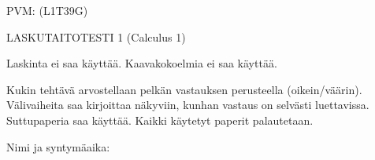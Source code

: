 \documentclass[finnish, a4paper, 12pt]{article}
\begin{document}
	
	
		PVM: \underline{\phantom{mm.mm.}}
		\hfill
		(L1T39G)	%
	
	\begin{center}
		{\large
			LASKUTAITOTESTI 1 (Calculus 1)}
	\end{center}
	
	Laskinta ei saa käyttää. Kaavakokoelmia ei saa käyttää.
	
	Kukin tehtävä arvostellaan pelkän vastauksen perusteella (oikein/väärin).
	Välivaiheita saa kirjoittaa näkyviin, kunhan vastaus on selvästi luettavissa.
	Suttupaperia saa käyttää. Kaikki käytetyt paperit palautetaan.
	
\vspace{12pt}
Nimi ja syntymäaika: \phantom{m} \hrulefill
\vspace{8pt}
	
\end{document}
